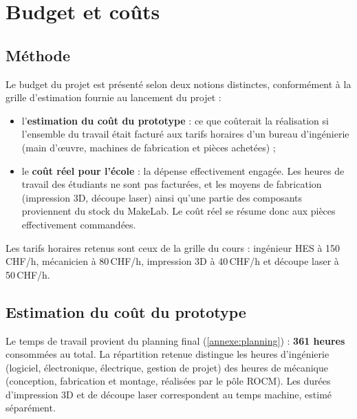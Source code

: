 \section{Budget et coûts}

\subsection{Méthode}

Le budget du projet est présenté selon deux notions distinctes, conformément
à la grille d'estimation fournie au lancement du projet :

\begin{itemize}
  \item l'\textbf{estimation du coût du prototype} : ce que coûterait la
        réalisation si l'ensemble du travail était facturé aux tarifs
        horaires d'un bureau d'ingénierie (main d'\oe uvre, machines de
        fabrication et pièces achetées) ;
  \item le \textbf{coût réel pour l'école} : la dépense effectivement engagée.
        Les heures de travail des étudiants ne sont pas facturées, et les
        moyens de fabrication (impression 3D, découpe laser) ainsi qu'une
        partie des composants proviennent du stock du MakeLab. Le coût réel
        se résume donc aux pièces effectivement commandées.
\end{itemize}

Les tarifs horaires retenus sont ceux de la grille du cours : ingénieur HES
à 150\,CHF/h, mécanicien à 80\,CHF/h, impression 3D à 40\,CHF/h et découpe
laser à 50\,CHF/h.

\subsection{Estimation du coût du prototype}

Le temps de travail provient du planning final (\autoref{annexe:planning}) :
\textbf{361 heures} consommées au total. La répartition retenue distingue
les heures d'ingénierie (logiciel, électronique, électrique, gestion de
projet) des heures de mécanique (conception, fabrication et montage,
réalisées par le pôle ROCM). Les durées d'impression 3D et de découpe laser
correspondent au temps machine, estimé séparément.

